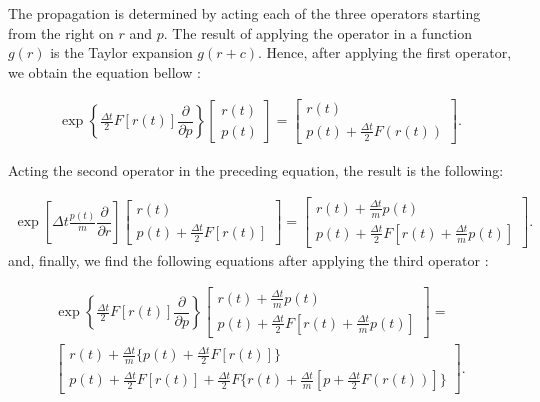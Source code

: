 \documentclass[
	12pt,				%
	openany,			%
	oneside,			%
	a4paper,			%
	english,			%
	brazil				%
	]{abntex2}
\begin{document}
The propagation is determined by acting each of the three operators starting from the right on $r$ and $p$. The result of applying the operator in a function $g(r)$ is the Taylor expansion $g(r+c)$. Hence,  after applying the first operator, we obtain the equation bellow \cite{tuckerman}:

\begin{equation}
\begin{aligned}
\exp \left \lbrace \frac{\Delta t}{2} F[r(t)] \dfrac{\partial}{\partial p} \right \rbrace
\left[ \begin{array}{c} r(t) \\ p(t) \end{array} \right] = 
\left[ \begin{array}{c} r(t) \\ p(t) + \frac{\Delta t}{2} F(r(t)) \end{array} \right] .
\end{aligned}
\end{equation}

Acting the second operator in the preceding equation, the result is the following:

\begin{equation}
\begin{aligned}
\exp \left[ \Delta t \frac{p(t)}{m}\dfrac{\partial }{\partial r} \right]
\left[ \begin{array}{c} r(t) \\ p(t) + \frac{\Delta t}{2} F[r(t)] \end{array} \right] = 
\left[ \begin{array}{c} r(t) + \frac{\Delta t}{m}p(t) \\ p(t) + \frac{\Delta t}{2} F[r(t) + \frac{\Delta t}{m}p(t) ] \end{array} \right] .
\end{aligned}
\end{equation}
and, finally, we find the following equations after applying the third operator :

\begin{equation}
\begin{aligned}
\exp \left \lbrace \frac{\Delta t}{2} F[r(t)] \dfrac{\partial}{\partial p} \right \rbrace
\left[ \begin{array}{c} r(t) + \frac{\Delta t}{m}p(t) \\ p(t) + \frac{\Delta t}{2} F[r(t) + \frac{\Delta t}{m}p(t) ] \end{array} \right]= \\ 
\left[ \begin{array}{c} r(t) + \frac{\Delta t}{m} \lbrace p(t)+\frac{\Delta t}{2} F[r(t)]\rbrace \\ p(t) + \frac{\Delta t}{2} F[r(t)] + \frac{\Delta t}{2} F\{r(t)+ \frac{\Delta t}{m} [p + \frac{\Delta t}{2}F(r(t))]\}\end{array} \right] .
\end{aligned}
\end{equation}
\end{document}
